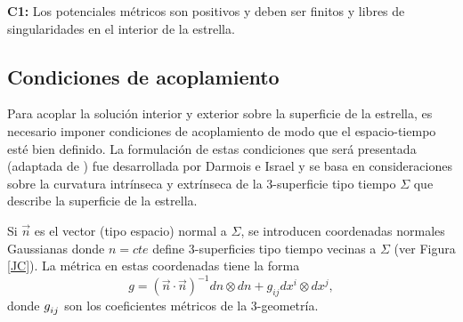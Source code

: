 \textbf{C1:} Los potenciales métricos son positivos y deben ser finitos y libres de singularidades en el interior de la estrella.
\subsection*{Condiciones de acoplamiento}
\noindent Para acoplar la solución interior y exterior sobre la superficie de la estrella, es necesario imponer condiciones de acoplamiento de modo que el espacio-tiempo esté bien definido. 
La formulación de estas condiciones que será presentada (adaptada de \cite{Misner1973}) fue desarrollada por Darmois \cite{Darmois1927} e Israel \cite{Israel1966} y se basa en consideraciones sobre la curvatura intrínseca y extrínseca de la 3-superficie tipo tiempo $\Sigma$ que describe la superficie de la estrella.
 
 Si $\vec{n}$ es el vector (tipo espacio) normal a $\Sigma$, se introducen coordenadas normales Gaussianas donde $n=cte$ define 3-superficies tipo tiempo vecinas a $\Sigma$ (ver Figura \ref{JC}). La métrica en estas coordenadas tiene la forma 
 \begin{equation}
g=(\vec{n} \cdot \vec{n})^{-1} d n\otimes d n +g_{i j} d x^{i} \otimes d x^{j},
\end{equation}
donde $\tensor{g}{_i_j}$ son los coeficientes métricos de la 3-geometría.  

